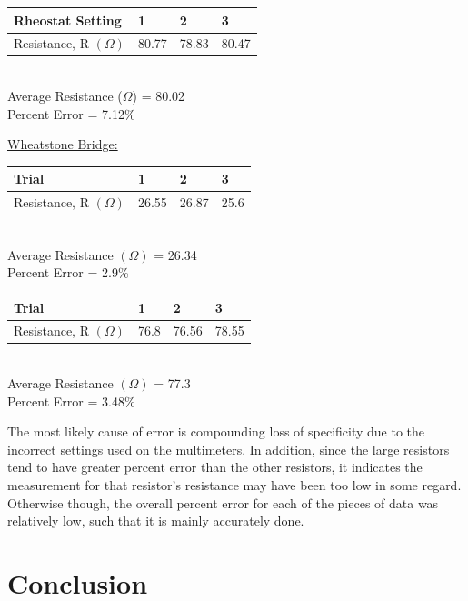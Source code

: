\documentclass[11pt, titlepage]{article}
\begin{document}
\begin{center}
\begin{tabular}
{|m{9em}|m{7em}|m{7em}|m{7em}|}
\hline
Rheostat Setting & 1 & 2 & 3 \\
\hline
Resistance, R $(\Omega)$ & 80.77 & 78.83 & 80.47\\
\hline
\end{tabular}
\\Average Resistance ($\Omega$) = 80.02
\\Percent Error = 7.12\%
\end{center}

\underline{Wheatstone Bridge:}
\begin{center}
\begin{tabular}
{|m{9em}|m{7em}|m{7em}|m{7em}|}
\hline
Trial & 1 & 2 & 3 \\
\hline
Resistance, R $(\Omega)$ & 26.55 & 26.87 & 25.6\\
\hline
\end{tabular}
\\Average Resistance $(\Omega)$ = 26.34
\\Percent Error = 2.9\%
\end{center}

\begin{center}
\begin{tabular}
{|m{9em}|m{7em}|m{7em}|m{7em}|}
\hline
Trial & 1 & 2 & 3 \\
\hline
Resistance, R $(\Omega)$ & 76.8 & 76.56 & 78.55 \\
\hline
\end{tabular}
\\Average Resistance $(\Omega)$ = 77.3
\\Percent Error = 3.48\%
\end{center}

The most likely cause of error is compounding loss of specificity due to the incorrect settings used on the multimeters. In addition, since the large resistors tend to have greater percent error than the other resistors, it indicates the measurement for that resistor's resistance may have been too low in some regard. Otherwise though, the overall percent error for each of the pieces of data was relatively low, such that it is mainly accurately done.

\section*{Conclusion}
\end{document}
